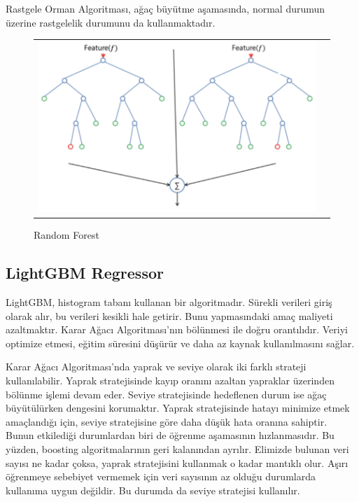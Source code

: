\documentclass[conference]{IEEEtran}
\begin{document}
\quad Rastgele Orman Algoritması, ağaç büyütme aşamasında, normal durumun üzerine rastgelelik durumunu da kullanmaktadır\cite{12}.
\begin{figure}[!h]
	\centering
	\begin{center}
		\begin{tabular}{cc}
			\includegraphics[scale=0.65]{pictures/pic_04.png}&
		\end{tabular}
	\end{center}
	\caption{Random Forest\cite{12}}
	\label{fig:04}
\end{figure}

\pagebreak
\subsection{\textbf{LightGBM Regressor}}
\quad LightGBM, histogram tabanı kullanan bir algoritmadır. Sürekli verileri giriş olarak alır, bu verileri kesikli hale getirir. Bunu yapmasındaki amaç maliyeti azaltmaktır. Karar Ağacı Algoritması’nın bölünmesi ile doğru orantılıdır. Veriyi optimize etmesi, eğitim süresini düşürür ve daha az kaynak kullanılmasını sağlar\cite{13}.

\quad Karar Ağacı Algoritması’nda yaprak ve seviye olarak iki farklı strateji kullanılabilir. Yaprak stratejisinde kayıp oranını azaltan yapraklar üzerinden bölünme işlemi devam eder. Seviye stratejisinde hedeflenen durum ise ağaç büyütülürken dengesini korumaktır. Yaprak stratejisinde hatayı minimize etmek amaçlandığı için, seviye stratejisine göre daha düşük hata oranına sahiptir. Bunun etkilediği durumlardan biri de öğrenme aşamasının hızlanmasıdır. Bu yüzden, boosting algoritmalarının geri kalanından ayrılır. Elimizde bulunan veri sayısı ne kadar çoksa, yaprak stratejisini kullanmak o kadar mantıklı olur. Aşırı öğrenmeye sebebiyet vermemek için veri sayısının az olduğu durumlarda kullanıma uygun değildir. Bu durumda da seviye stratejisi kullanılır\cite{13}.
\end{document}
